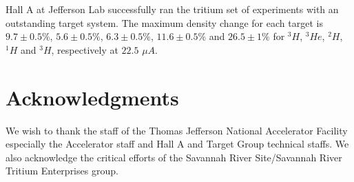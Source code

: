 \documentclass[final,5p,times,twocolumn]{elsarticle}
\begin{document}
Hall A at Jefferson Lab successfully ran the tritium set of experiments with an outstanding target system.  The maximum density change for each target is $9.7 \pm 0.5 \%$, $5.6 \pm 0.5\% $, $6.3 \pm 0.5\% $, $11.6\pm 0.5\% $ and $26.5 \pm 1 \%$ for $^{3}H$, $^{3}He$, $^{2}H$, $^{1}H$ and $^{3}H$, respectively at $22.5$ $\mu A$. 


\section{Acknowledgments}

We wish to thank the staff of the Thomas Jefferson National Accelerator Facility especially the Accelerator staff and  Hall A and Target Group technical staffs. We also acknowledge the critical efforts of the Savannah River Site/Savannah River Tritium Enterprises group.


 

\end{document}
